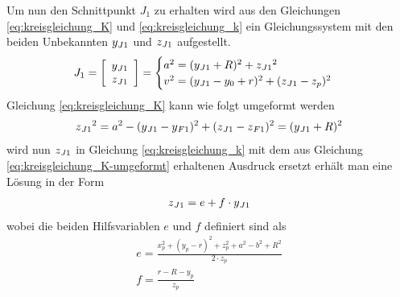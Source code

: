 \documentclass[Bachelor, BMR, ngerman]{twbook}
\begin{document}
    \noindent
    Um nun den Schnittpunkt $J_1$ zu erhalten wird aus den Gleichungen \ref{eq:kreisgleichung_K} und \ref{eq:kreisgleichung_k} ein Gleichungssystem mit den beiden Unbekannten $y\textsubscript{$J1$}$ und $z\textsubscript{$J1$}$ aufgestellt.
    \newline
    \begin{align}
        J_1 = 
            \left[
                \begin{array}{c} 
                    y\textsubscript{$J1$}\\
                    z\textsubscript{$J1$} 
                \end{array}
            \right] =
            \begin{cases}
                a^2 = (y\textsubscript{$J1$} + R)^2 + z\textsubscript{$J1$}^2\\
                v^2 = (y\textsubscript{$J1$} - y_0 + r)^2 + (z\textsubscript{$J1$} - z_p)^2
            \end{cases}
        \label{eq:J1-gleichungssystem}
    \end{align}
    \noindent
    Gleichung \ref{eq:kreisgleichung_K} kann wie folgt umgeformt werden
    \newline
    \begin{align}
        z\textsubscript{$J1$}^2 = a^2 - (y\textsubscript{$J1$} - y\textsubscript{$F1$})^2 + (z\textsubscript{$J1$} - z\textsubscript{$F1$})^2 = (y\textsubscript{$J1$} + R)^2 
        \label{eq:kreisgleichung_K-umgeformt}
    \end{align}
    \noindent
    wird nun $z\textsubscript{$J1$}$ in Gleichung \ref{eq:kreisgleichung_k} mit dem aus Gleichung \ref{eq:kreisgleichung_K-umgeformt} erhaltenen Ausdruck ersetzt erhält man eine Lösung in der Form
    \newline
    \begin{align}
        z\textsubscript{$J1$} = e + f \cdot y\textsubscript{$J1$}
        \label{eq:zJ1}
    \end{align}
    \noindent
    wobei die beiden Hilfsvariablen $e$ und $f$ definiert sind als
    \newline
    \begin{align}
        e = \frac{x_p^2 + (y_p - r)^2 + z_p^2 + a^2 - b^2 + R^2}{2 \cdot z_p} \nonumber \\
        f = \frac{r-R-y_p}{z_p}
        \label{eq:ef}
    \end{align}
\end{document}
